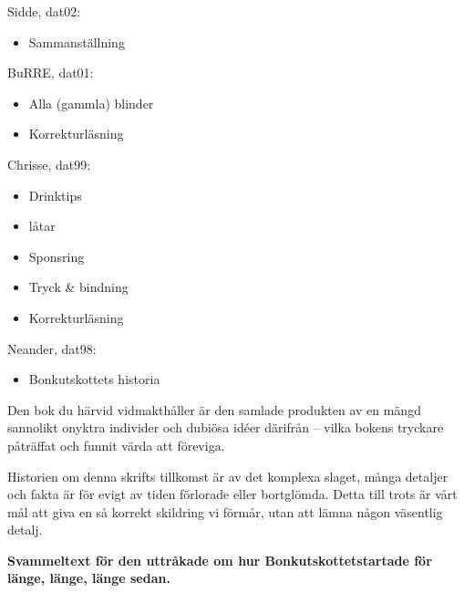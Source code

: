 Sidde, dat02:
\begin{itemize}
  \item Sammanställning
\end{itemize}
BuRRE, dat01:
\begin{itemize}
  \item Alla (gammla) blinder
  \item Korrekturläsning
\end{itemize}
Chrisse, dat99:
\begin{itemize}
  \item Drinktips
  \item låtar
  \item Sponsring
  \item Tryck \& bindning
  \item Korrekturläsning
\end{itemize}
Neander, dat98:
\begin{itemize}
  \item Bonkutskottets historia
\end{itemize}

\newpage



Den bok du härvid vidmakthåller är den samlade produkten av en mängd sannolikt onyktra individer och dubiösa idéer därifrån -- vilka bokens tryckare påträffat och funnit värda att föreviga.

Historien om denna skrifts tillkomst är av det komplexa slaget, många detaljer och fakta är för evigt av tiden förlorade eller bortglömda. Detta till trots är vårt mål att giva en så korrekt skildring vi förmår, utan att lämna någon väsentlig detalj.

\textbf{Svammeltext för den uttråkade om hur Bonkutskottetstartade för länge, länge, länge sedan.}

